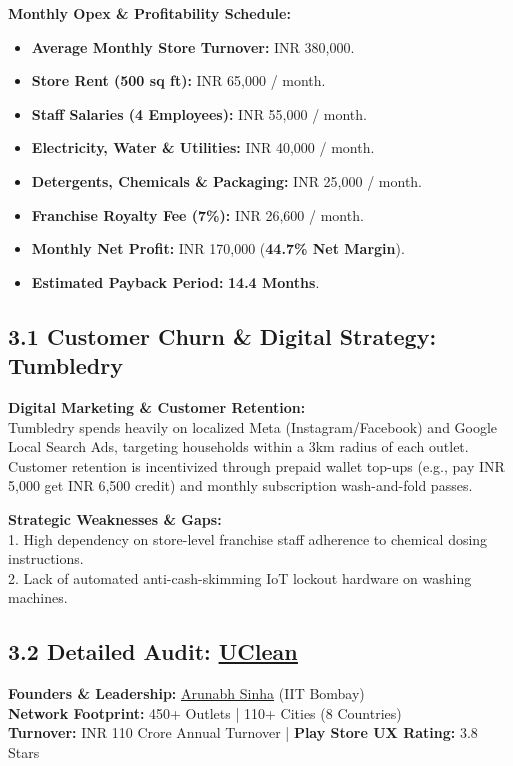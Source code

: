 \documentclass[11pt,a4paper]{article}
\begin{document}
\vspace{0.4cm}
\textbf{Monthly Opex \& Profitability Schedule:}
\begin{itemize}
    \item \textbf{Average Monthly Store Turnover:} INR 380,000.
    \item \textbf{Store Rent (500 sq ft):} INR 65,000 / month.
    \item \textbf{Staff Salaries (4 Employees):} INR 55,000 / month.
    \item \textbf{Electricity, Water \& Utilities:} INR 40,000 / month.
    \item \textbf{Detergents, Chemicals \& Packaging:} INR 25,000 / month.
    \item \textbf{Franchise Royalty Fee (7\%):} INR 26,600 / month.
    \item \textbf{Monthly Net Profit:} INR 170,000 (\textbf{44.7\% Net Margin}).
    \item \textbf{Estimated Payback Period:} \textbf{14.4 Months}.
\end{itemize}

\clearpage

\subsection{3.1 Customer Churn \& Digital Strategy: Tumbledry}
\textbf{Digital Marketing \& Customer Retention:}\\
Tumbledry spends heavily on localized Meta (Instagram/Facebook) and Google Local Search Ads, targeting households within a 3km radius of each outlet. Customer retention is incentivized through prepaid wallet top-ups (e.g., pay INR 5,000 get INR 6,500 credit) and monthly subscription wash-and-fold passes.

\vspace{0.5cm}
\textbf{Strategic Weaknesses \& Gaps:}\\
1. High dependency on store-level franchise staff adherence to chemical dosing instructions.\\
2. Lack of automated anti-cash-skimming IoT lockout hardware on washing machines.

\clearpage

\subsection{3.2 Detailed Audit: \href{https://uclean.in}{\underline{UClean}}}
\textbf{Founders \& Leadership:} \href{https://www.linkedin.com/in/arunabhsinha/}{\underline{Arunabh Sinha}} (IIT Bombay)\\
\textbf{Network Footprint:} 450+ Outlets | 110+ Cities (8 Countries)\\
\textbf{Turnover:} INR 110 Crore Annual Turnover | \textbf{Play Store UX Rating:} 3.8 Stars
\end{document}
